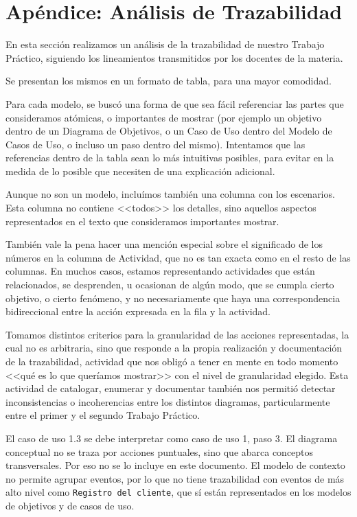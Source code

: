 \section{Apéndice: Análisis de Trazabilidad}

En esta sección realizamos un análisis de la trazabilidad de nuestro Trabajo
Práctico, siguiendo los lineamientos transmitidos por los docentes de la
materia.

Se presentan los mismos en un formato de tabla, para una mayor comodidad.

Para cada modelo, se buscó una forma de que sea fácil referenciar las partes
que consideramos atómicas, o importantes de mostrar (por ejemplo un objetivo
dentro de un Diagrama de Objetivos, o un Caso de Uso dentro del Modelo de
Casos de Uso, o incluso un paso dentro del mismo). Intentamos que las
referencias dentro de la tabla sean lo más intuitivas posibles, para evitar en
la medida de lo posible que necesiten de una explicación adicional.

Aunque no son un modelo, incluímos también una columna con los escenarios.
Esta columna no contiene <<todos>> los detalles, sino aquellos aspectos
representados en el texto que consideramos importantes mostrar.

También vale la pena hacer una mención especial sobre el significado de los
números en la columna de Actividad, que no es tan exacta como en el resto de
las columnas. En muchos casos, estamos representando actividades que están
relacionados, se desprenden, u ocasionan de algún modo, que se cumpla cierto
objetivo, o cierto fenómeno, y no necesariamente que haya una correspondencia
bidireccional entre la acción expresada en la fila y la actividad.

Tomamos distintos criterios para la granularidad de las acciones
representadas, la cual no es arbitraria, sino que responde a la propia
realización y documentación de la trazabilidad, actividad que nos obligó a
tener en mente en todo momento <<qué es lo que queríamos mostrar>> con el
nivel de granularidad elegido. Esta actividad de catalogar, enumerar y
documentar también nos permitió detectar inconsistencias o incoherencias entre
los distintos diagramas, particularmente entre el primer y el segundo
Trabajo Práctico.

El caso de uso 1.3 se debe interpretar como caso de uso 1, paso 3.
El diagrama conceptual no se traza por acciones puntuales, sino que abarca
conceptos transversales. Por eso no se lo incluye en este documento.
El modelo de contexto no permite agrupar eventos, por lo que no tiene
trazabilidad con eventos de más alto nivel como \texttt{Registro del cliente},
que sí están representados en los modelos de objetivos y de casos de uso.

